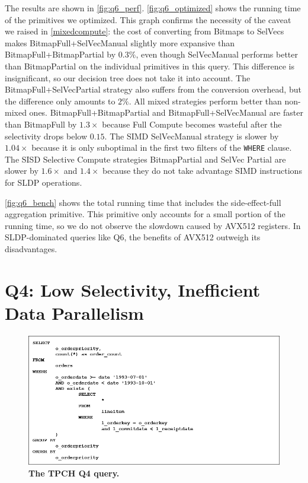\documentclass[12pt]{cmuthesis}
\begin{document}
The results are shown in \cref{fig:q6_perf}. \cref{fig:q6_optimized} shows the running time of the primitives we optimized. This graph confirms the necessity of the caveat we raised in \cref{mixedcompute}: the cost of converting from Bitmaps to SelVecs makes BitmapFull+SelVecManual slightly more expansive than BitmapFull+BitmapPartial by $0.3\%$, even though SelVecManual performs better than BitmapPartial on the individual primitives in this query. This difference is insignificant, so our decision tree does not take it into account. The BitmapFull+SelVecPartial strategy also suffers from the conversion overhead, but the difference only amounts to $2\%$. All mixed strategies perform better than non-mixed ones. BitmapFull+BitmapPartial and BitmapFull+SelVecManual are faster than BitmapFull by $1.3\times$ because Full Compute becomes wasteful after the selectivity drops below $0.15$. The SIMD SelVecManual strategy is slower by $1.04\times$ because it is only suboptimal in the first two filters of the \texttt{WHERE} clause. The SISD Selective Compute strategies BitmapPartial and SelVec Partial are slower by $1.6\times$ and $1.4\times$ because they do not take advantage SIMD instructions for SLDP operations.

\cref{fig:q6_bench} shows the total running time that includes the side-effect-full aggregation primitive. This primitive only accounts for a small portion of the running time, so we do not observe the slowdown caused by AVX512 registers. In SLDP-dominated queries like Q6, the benefits of AVX512 outweigh its disadvantages.

\section{Q4: Low Selectivity, Inefficient Data Parallelism}
\label{q4section}
\begin{figure}[t!]
    \centering
    \includegraphics[scale=0.5]{images/TPCH-Q4.png}
    \caption{\textbf{The TPCH Q4 query.}}
    \label{fig:tpch_q4}
\end{figure}
\end{document}
